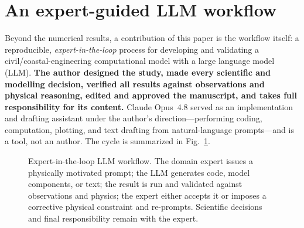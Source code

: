 \documentclass[Journal]{ascelike}   %
\begin{document}
\section{An expert-guided LLM workflow}
\label{sec:workflow}
Beyond the numerical results, a contribution of this paper is the workflow itself: a
reproducible, \emph{expert-in-the-loop} process for developing and validating a
civil/coastal-engineering computational model with a large language model (LLM).
\textbf{The author designed the study, made every scientific and modelling decision,
verified all results against observations and physical reasoning, edited and approved
the manuscript, and takes full responsibility for its content.} Claude Opus~4.8
\citep{anthropic2026claude} served as an implementation and drafting assistant under
the author's direction---performing coding, computation, plotting, and text drafting
from natural-language prompts---and is a tool, not an author. The cycle is summarized
in Fig.~\ref{fig:loop}.

\begin{figure}[t]\centering
{}
\caption{Expert-in-the-loop LLM workflow. The domain expert issues a physically
motivated prompt; the LLM generates code, model components, or text; the result is run
and validated against observations and physics; the expert either accepts it or
imposes a corrective physical constraint and re-prompts. Scientific decisions and
final responsibility remain with the expert.}
\label{fig:loop}
\end{figure}
\end{document}
